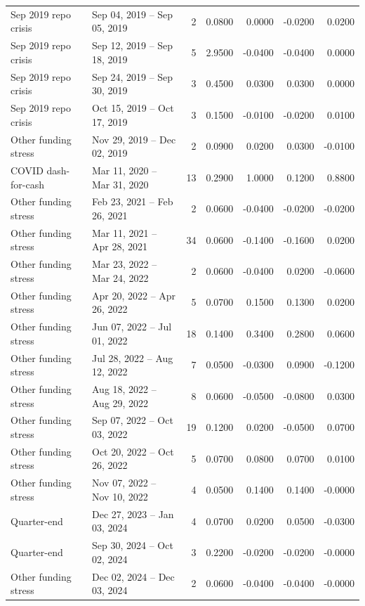 \begin{table}[htbp]
{\begin{tabular}{llrrrrr}
  Sep 2019 repo crisis & Sep 04, 2019 -- Sep 05, 2019 & 2 & 0.0800 & 0.0000 & -0.0200 & 0.0200 \\ 
  Sep 2019 repo crisis & Sep 12, 2019 -- Sep 18, 2019 & 5 & 2.9500 & -0.0400 & -0.0400 & 0.0000 \\ 
  Sep 2019 repo crisis & Sep 24, 2019 -- Sep 30, 2019 & 3 & 0.4500 & 0.0300 & 0.0300 & 0.0000 \\ 
  Sep 2019 repo crisis & Oct 15, 2019 -- Oct 17, 2019 & 3 & 0.1500 & -0.0100 & -0.0200 & 0.0100 \\ 
  Other funding stress & Nov 29, 2019 -- Dec 02, 2019 & 2 & 0.0900 & 0.0200 & 0.0300 & -0.0100 \\ 
  COVID dash-for-cash & Mar 11, 2020 -- Mar 31, 2020 & 13 & 0.2900 & 1.0000 & 0.1200 & 0.8800 \\ 
  Other funding stress & Feb 23, 2021 -- Feb 26, 2021 & 2 & 0.0600 & -0.0400 & -0.0200 & -0.0200 \\ 
  Other funding stress & Mar 11, 2021 -- Apr 28, 2021 & 34 & 0.0600 & -0.1400 & -0.1600 & 0.0200 \\ 
  Other funding stress & Mar 23, 2022 -- Mar 24, 2022 & 2 & 0.0600 & -0.0400 & 0.0200 & -0.0600 \\ 
  Other funding stress & Apr 20, 2022 -- Apr 26, 2022 & 5 & 0.0700 & 0.1500 & 0.1300 & 0.0200 \\ 
  Other funding stress & Jun 07, 2022 -- Jul 01, 2022 & 18 & 0.1400 & 0.3400 & 0.2800 & 0.0600 \\ 
  Other funding stress & Jul 28, 2022 -- Aug 12, 2022 & 7 & 0.0500 & -0.0300 & 0.0900 & -0.1200 \\ 
  Other funding stress & Aug 18, 2022 -- Aug 29, 2022 & 8 & 0.0600 & -0.0500 & -0.0800 & 0.0300 \\ 
  Other funding stress & Sep 07, 2022 -- Oct 03, 2022 & 19 & 0.1200 & 0.0200 & -0.0500 & 0.0700 \\ 
  Other funding stress & Oct 20, 2022 -- Oct 26, 2022 & 5 & 0.0700 & 0.0800 & 0.0700 & 0.0100 \\ 
  Other funding stress & Nov 07, 2022 -- Nov 10, 2022 & 4 & 0.0500 & 0.1400 & 0.1400 & -0.0000 \\ 
  Quarter-end & Dec 27, 2023 -- Jan 03, 2024 & 4 & 0.0700 & 0.0200 & 0.0500 & -0.0300 \\ 
  Quarter-end & Sep 30, 2024 -- Oct 02, 2024 & 3 & 0.2200 & -0.0200 & -0.0200 & -0.0000 \\ 
  Other funding stress & Dec 02, 2024 -- Dec 03, 2024 & 2 & 0.0600 & -0.0400 & -0.0400 & -0.0000 \\ 

\end{tabular}}
\end{table}
